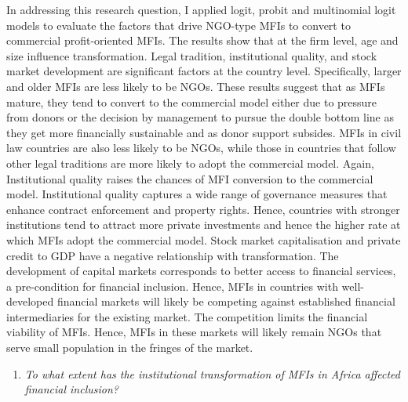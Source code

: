 \documentclass[a4paper, nobind]{templates/ociamthesis}
\providecommand{\tightlist}{%
  \setlength{\itemsep}{0pt}\setlength{\parskip}{0pt}}
\begin{document}
In addressing this research question, I applied logit, probit and multinomial logit models to evaluate the factors that drive NGO-type MFIs to convert to commercial profit-oriented MFIs. The results show that at the firm level, age and size influence transformation. Legal tradition, institutional quality, and stock market development are significant factors at the country level. Specifically, larger and older MFIs are less likely to be NGOs. These results suggest that as MFIs mature, they tend to convert to the commercial model either due to pressure from donors or the decision by management to pursue the double bottom line as they get more financially sustainable and as donor support subsides. MFIs in civil law countries are also less likely to be NGOs, while those in countries that follow other legal traditions are more likely to adopt the commercial model. Again, Institutional quality raises the chances of MFI conversion to the commercial model. Institutional quality captures a wide range of governance measures that enhance contract enforcement and property rights. Hence, countries with stronger institutions tend to attract more private investments and hence the higher rate at which MFIs adopt the commercial model. Stock market capitalisation and private credit to GDP have a negative relationship with transformation. The development of capital markets corresponds to better access to financial services, a pre-condition for financial inclusion. Hence, MFIs in countries with well-developed financial markets will likely be competing against established financial intermediaries for the existing market. The competition limits the financial viability of MFIs. Hence, MFIs in these markets will likely remain NGOs that serve small population in the fringes of the market.

\begin{enumerate}
\def\labelenumi{\arabic{enumi}.}
\setcounter{enumi}{1}
\tightlist
\item
  \emph{To what extent has the institutional transformation of MFIs in Africa affected financial inclusion?}
\end{enumerate}
\end{document}
